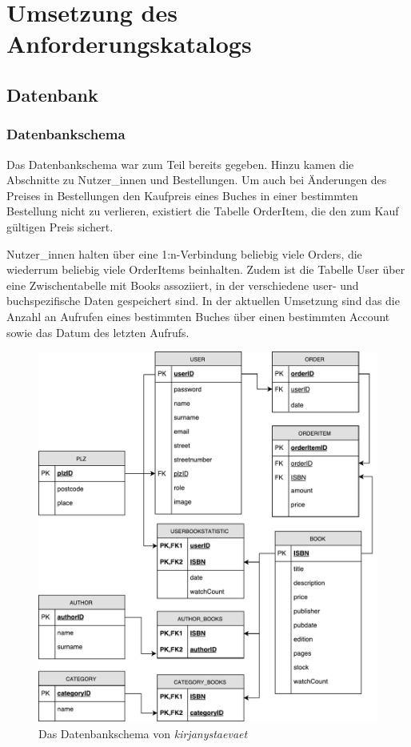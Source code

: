 \section{Umsetzung des Anforderungskatalogs}\label{sec:umsetzung}
	\subsection{Datenbank}\label{sec:umsetzung:DB:DBS}
		\subsubsection{Datenbankschema}\label{sec:umsetzung:DB:Schema}
		Das Datenbankschema war zum Teil bereits gegeben. Hinzu kamen die Abschnitte zu Nutzer\_innen und Bestellungen. Um auch bei Änderungen des Preises in Bestellungen den Kaufpreis eines Buches in einer bestimmten Bestellung nicht zu verlieren, existiert die Tabelle OrderItem, die den zum Kauf gültigen Preis sichert.
		
		Nutzer\_innen halten über eine 1:n-Verbindung beliebig viele Orders, die wiederrum beliebig viele OrderItems beinhalten. Zudem ist die Tabelle User über eine Zwischentabelle mit Books assoziiert, in der verschiedene user- und buchspezifische Daten gespeichert sind. In der aktuellen Umsetzung sind das die Anzahl an Aufrufen eines bestimmten Buches über einen bestimmten Account sowie das Datum des letzten Aufrufs.
	
	
\begin{figure}[h]
\centering
\includegraphics[width=\linewidth]{files/db-schema}
\caption{Das Datenbankschema von \textit{kirjanystaevaet}}
\label{fig:db-schema}
\end{figure}


